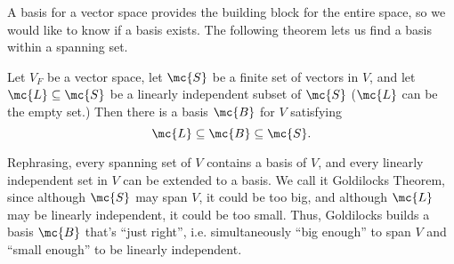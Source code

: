 \documentclass[math1530-lecture-notes]{subfiles}
\begin{document}
A basis for a vector space provides the building block for the entire space, so we would like to
know if a basis exists. The following theorem lets us find a basis within a spanning set.
\begin{theorem}{}
  Let $V_F$ be a vector space, let $\mc{S}$ be a finite set of vectors in $V$, and let
  $\mc{L}\subseteq \mc{S}$ be a linearly independent subset of $\mc{S}$ ($\mc{L}$ can be the empty
  set.) Then there is a basis $\mc{B}$ for $V$ satisfying \[
    \mc{L}\subseteq \mc{B}\subseteq \mc{S}
  .\]
\end{theorem}
Rephrasing, every spanning set of $V$ contains a basis of $V$, and every linearly independent set in
$V$ can be extended to a basis. We call it Goldilocks Theorem, since although $\mc{S}$ may span
$V$, it could be too big, and although $\mc{L}$ may be linearly independent, it could be too small.
Thus, Goldilocks builds a basis $\mc{B}$ that's ``just right'', i.e. simultaneously ``big enough''
to span $V$ and ``small enough'' to be linearly independent.
\end{document}
